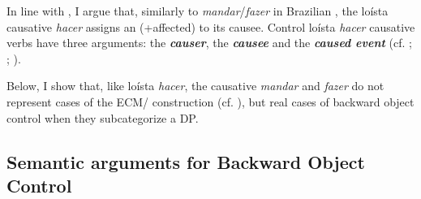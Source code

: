 \documentclass[output=paper]{langsci/langscibook}
\begin{document}
In line with \citet{López2001}, I argue that, similarly to \textit{mandar}/\textit{fazer} in Brazilian , the loísta causative \textit{hacer} assigns an (+affected)  to its causee. Control loísta \textit{hacer} causative verbs have three arguments: the \textbf{\textit{causer}}, the \textbf{\textit{causee} }and the \textbf{\textit{caused event}} (cf. \citealt{Zubizarreta1985}; \citealt{Alsina1992}; \citealt{Ippolito2000}). 

Below, I show that, like loísta \textit{hacer}, the causative \textit{mandar} and \textit{fazer} do not represent cases of the ECM\slash {} construction (cf. \citealt{Farrell1995}), but real cases of backward object control when they subcategorize a DP.

\subsection{Semantic arguments for Backward Object Control} %
\end{document}
